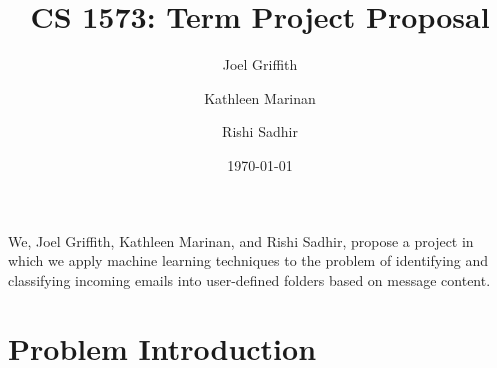 \documentclass[11pt]{article}
\title{CS 1573: Term Project Proposal}
\author{Joel Griffith\and Kathleen Marinan\and Rishi Sadhir}
\date{\today}
\begin{document}
\maketitle

\setcounter{tocdepth}{3}
\tableofcontents
\vspace*{1cm}


We, Joel Griffith, Kathleen Marinan, and Rishi Sadhir, propose a project in which we apply machine learning techniques to the problem of identifying and classifying incoming emails into user-defined folders based on message content.

\section{Problem Introduction}
\label{sec-1}
\end{document}
